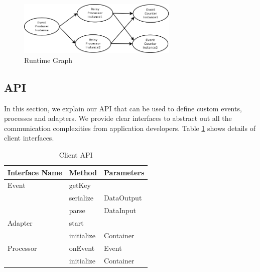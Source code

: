 \begin{figure}[!t]
        \centering
        \includegraphics[width=3.0in]{runtimegraph.png}
        \caption{Runtime Graph}
        \label{runtimegraph}
\end{figure}

\subsection{API}
In this section, we explain our API that can be used to define custom events, processes and adapters. We provide clear interfaces to abstract out all the communication complexities from application developers. Table \ref{api} shows details of client interfaces.



\begin{table}[ht]
	\centering
	\begin{tabular}{| l | l | l |}
        \hline
        Interface Name &  Method & Parameters \\
        \hline
        Event   & getKey &  \\
        \cline{2-3}
        & serialize &  DataOutput \\
	\cline{2-3}        
        & parse &  DataInput \\
        \hline
        Adapter   & start &  \\
        \cline{2-3}
        & initialize &  Container \\
        \hline
        Processor   & onEvent & Event \\
        \cline{2-3}
        & initialize &  Container \\
        \hline
        \end{tabular}
        \caption{Client API}
        \label{api}
\end{table}



